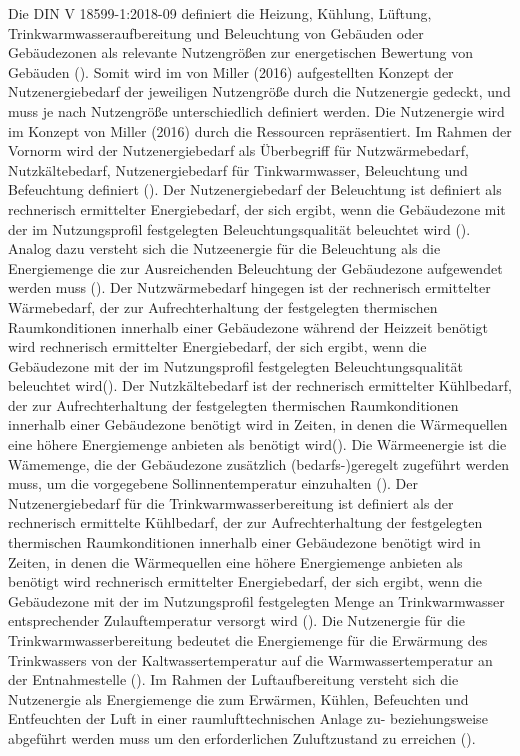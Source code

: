 Die DIN V 18599-1:2018-09 definiert die Heizung, Kühlung, Lüftung, Trinkwarmwasseraufbereitung und Beleuchtung von Gebäuden oder Gebäudezonen 
als relevante Nutzengrößen zur energetischen Bewertung von Gebäuden (\cite{DIN18599.2018}). 
Somit wird im von Miller (2016) aufgestellten Konzept der Nutzenergiebedarf der jeweiligen Nutzengröße durch die Nutzenergie gedeckt, 
und muss je nach Nutzengröße unterschiedlich definiert werden. Die Nutzenergie wird im Konzept von Miller (2016) durch die Ressourcen repräsentiert.
Im Rahmen der Vornorm wird der Nutzenergiebedarf als Überbegriff für Nutzwärmebedarf, Nutzkältebedarf, Nutzenergiebedarf für Tinkwarmwasser, Beleuchtung und 
Befeuchtung definiert (\cite[Kapitel 3.1.3]{DIN18599.2018}).
Der Nutzenergiebedarf der Beleuchtung ist definiert als rechnerisch ermittelter Energiebedarf, der sich ergibt, wenn die Gebäudezone mit der im Nutzungsprofil 
festgelegten Beleuchtungsqualität beleuchtet wird (\cite[Kapitel 3.1.6]{DIN18599.2018}). 
Analog dazu versteht sich die Nutzeenergie für die Beleuchtung als die Energiemenge die zur Ausreichenden Beleuchtung der Gebäudezone aufgewendet werden muss (\cite[Kapitel 5.3.1]{DIN18599.2018}).
Der Nutzwärmebedarf hingegen ist der rechnerisch ermittelter Wärmebedarf, der zur Aufrechterhaltung der festgelegten thermischen Raumkonditionen innerhalb einer Gebäudezone während der Heizzeit benötigt wird
rechnerisch ermittelter Energiebedarf, der sich ergibt, wenn die Gebäudezone mit der im Nutzungsprofil festgelegten Beleuchtungsqualität beleuchtet wird(\cite[Kapitel 3.1.4]{DIN18599.2018}).
Der Nutzkältebedarf ist der rechnerisch ermittelter Kühlbedarf, der zur Aufrechterhaltung der festgelegten thermischen Raumkonditionen innerhalb einer Gebäudezone benötigt wird in Zeiten, 
in denen die Wärmequellen eine höhere Energiemenge anbieten als benötigt wird(\cite[Kapitel 3.1.5]{DIN18599.2018}).
Die Wärmeenergie ist die Wämemenge, die der Gebäudezone zusätzlich (bedarfs-)geregelt zugeführt werden muss, um die vorgegebene 
Sollinnentemperatur einzuhalten (\cite[Kapitel 5.3.1]{DIN18599.2018}).
Der Nutzenergiebedarf für die Trinkwarmwasserbereitung ist definiert als der rechnerisch ermittelte Kühlbedarf, der zur Aufrechterhaltung der festgelegten thermischen Raumkonditionen innerhalb einer Gebäudezone benötigt wird in Zeiten, in denen die Wärmequellen eine höhere Energiemenge anbieten als benötigt wird
rechnerisch ermittelter Energiebedarf, der sich ergibt, wenn die Gebäudezone mit der im Nutzungsprofil festgelegten Menge an Trinkwarmwasser entsprechender Zulauftemperatur versorgt wird (\cite[Kapitel 3.1.7]{DIN18599.2018}).
Die Nutzenergie für die Trinkwarmwasserbereitung bedeutet die Energiemenge für die Erwärmung des Trinkwassers von der Kaltwassertemperatur auf die 
Warmwassertemperatur an der Entnahmestelle (\cite[Kapitel 5.3.1]{DIN18599.2018}).
Im Rahmen der Luftaufbereitung versteht sich die Nutzenergie als Energiemenge die zum Erwärmen, Kühlen, Befeuchten und Entfeuchten der Luft in einer 
raumlufttechnischen Anlage zu- beziehungsweise abgeführt werden muss um den erforderlichen Zuluftzustand zu erreichen (\cite[Kapitel 5.3.1]{DIN18599.2018}).

